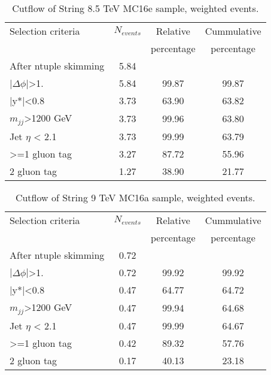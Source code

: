 \begin{table}[ht]
\begin{center}
\begin{tabular}{|l|c|c|c|}
\hline
Selection criteria & $N_{events}$ & Relative & Cummulative \\
 & & percentage & percentage \\
\hline
After ntuple skimming & 5.84 &  &  \\
$|\Delta\phi|$>1. & 5.84 & 99.87 & 99.87 \\
|y*|<0.8 & 3.73 & 63.90 & 63.82 \\
$m_{jj}$>1200 GeV & 3.73 & 99.96 & 63.80 \\
Jet $\eta$ < 2.1 & 3.73 & 99.99 & 63.79 \\
>=1 gluon tag & 3.27 & 87.72 & 55.96 \\
2 gluon tag & 1.27 & 38.90 & 21.77 \\
\hline
\end{tabular}
\end{center}
\caption{Cutflow of String 8.5 TeV MC16e sample, weighted events.}
\end{table}

\begin{table}[ht]
\begin{center}
\begin{tabular}{|l|c|c|c|}
\hline
Selection criteria & $N_{events}$ & Relative & Cummulative \\
 & & percentage & percentage \\
\hline
After ntuple skimming & 0.72 &  &  \\
$|\Delta\phi|$>1. & 0.72 & 99.92 & 99.92 \\
|y*|<0.8 & 0.47 & 64.77 & 64.72 \\
$m_{jj}$>1200 GeV & 0.47 & 99.94 & 64.68 \\
Jet $\eta$ < 2.1 & 0.47 & 99.99 & 64.67 \\
>=1 gluon tag & 0.42 & 89.32 & 57.76 \\
2 gluon tag & 0.17 & 40.13 & 23.18 \\
\hline
\end{tabular}
\end{center}
\caption{Cutflow of String 9 TeV MC16a sample, weighted events.}
\end{table}

